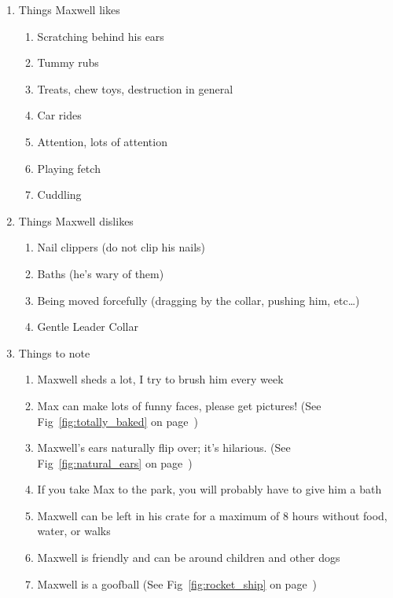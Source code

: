 \documentclass[pdftex,12pt]{article}
\begin{document}
\begin{enumerate}\label{itm:other_information}
    \item Things Maxwell likes
        \begin{enumerate}
            \item Scratching behind his ears
            \item Tummy rubs
            \item Treats, chew toys, destruction in general
            \item Car rides
            \item Attention, lots of attention
            \item Playing fetch
            \item Cuddling
        \end{enumerate}
    \item Things Maxwell dislikes
        \begin{enumerate}
            \item Nail clippers (do not clip his nails)
            \item Baths (he's wary of them)
            \item Being moved forcefully (dragging by the collar, pushing him,
                etc\ldots)
            \item Gentle Leader Collar
        \end{enumerate}
    \item Things to note
        \begin{enumerate}
            \item Maxwell sheds a lot, I try to brush him every week
            \item Max can make lots of funny faces, please get pictures! (See
                Fig~\ref{fig:totally_baked} on page~\pageref{fig:totally_baked})
            \item Maxwell's ears naturally flip over; it's hilarious. (See
                Fig~\ref{fig:natural_ears} on page~\pageref{fig:natural_ears})
            \item If you take Max to the park, you will probably have to give
                him a bath
            \item Maxwell can be left in his crate for a maximum of 8 hours
                without food, water, or walks
            \item Maxwell is friendly and can be around children and other dogs
            \item Maxwell is a goofball (See Fig~\ref{fig:rocket_ship} on
                page~\pageref{fig:rocket_ship})
        \end{enumerate}
\end{enumerate}
\end{document}
